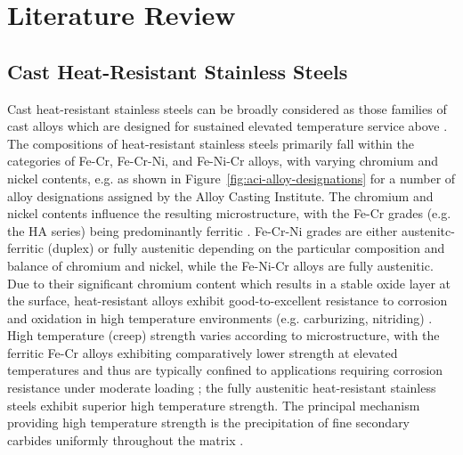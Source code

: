 \chapter{Literature Review} \label{ch:literature-review}

\section{Cast Heat-Resistant Stainless Steels}
Cast heat-resistant stainless steels can be broadly considered as those families of cast alloys which are designed for sustained elevated temperature service above  \cite{blair_cast_stainless_1990}.  The compositions of heat-resistant stainless steels primarily fall within the categories of Fe-Cr, Fe-Cr-Ni, and Fe-Ni-Cr alloys, with varying chromium and nickel contents, e.g. as shown in Figure~\ref{fig:aci-alloy-designations} for a number of alloy designations assigned by the Alloy Casting Institute. The chromium and nickel contents influence the resulting microstructure, with the Fe-Cr grades (e.g. the HA series) being predominantly ferritic \cite{davis_metallurgy_1994}. Fe-Cr-Ni grades are either austenitc-ferritic (duplex) or fully austenitic depending on the particular composition and balance of chromium and nickel, while the Fe-Ni-Cr alloys are fully austenitic. Due to their significant chromium content which results in a stable oxide layer at the surface, heat-resistant alloys exhibit good-to-excellent resistance to corrosion and oxidation in high temperature environments (e.g. carburizing, nitriding) \cite{davis_metallurgy_1994}. High temperature (creep) strength varies according to microstructure, with the ferritic Fe-Cr alloys exhibiting comparatively lower strength at elevated temperatures \cite{avery_cast_1969} and thus are typically confined to applications requiring corrosion resistance under moderate loading \cite{davis_metallurgy_1994}; the fully austenitic heat-resistant stainless steels exhibit superior high temperature strength. The principal mechanism providing high temperature strength is the precipitation of fine secondary carbides uniformly throughout the matrix \cite{avery_cast_1969,davis_metallurgy_1994}. 


